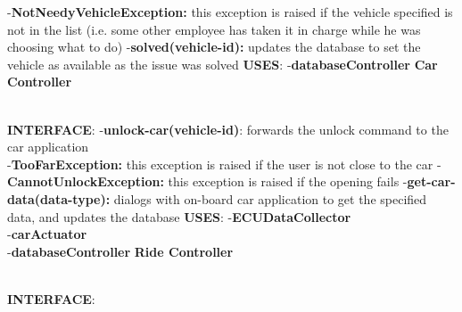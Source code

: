 \documentclass{article}
\begin{document}
-\textbf{NotNeedyVehicleException:} this exception is raised if the vehicle specified is not in the list (i.e. some other employee has taken it in charge while he was choosing what to do)
\newline
-\textbf{solved(vehicle-id):} updates the database to set the vehicle as available as the issue was solved
\newline
\textbf{USES}:   
\newline
-\textbf{databaseController}
\newpage
\textbf{Car Controller}\\
\begin{figure}[ht]
\end{figure}\\
\textbf{INTERFACE}: 
 \newline
-\textbf{unlock-car(vehicle-id)}: forwards the unlock command to the car application\\
-\textbf{TooFarException:} this exception is raised if the user is not close to the car 
\newline
-\textbf{CannotUnlockException:} this exception is raised if the opening fails
\newline
-\textbf{get-car-data(data-type):} dialogs with on-board car application to get the specified data, and updates the database
\newline
\textbf{USES}:   
\newline
-\textbf{ECUDataCollector}\\
-\textbf{carActuator}\\
-\textbf{databaseController}
\newpage
\textbf{Ride Controller}\\
\begin{figure}[ht]
\end{figure}\\
\textbf{INTERFACE}: 
\end{document}
